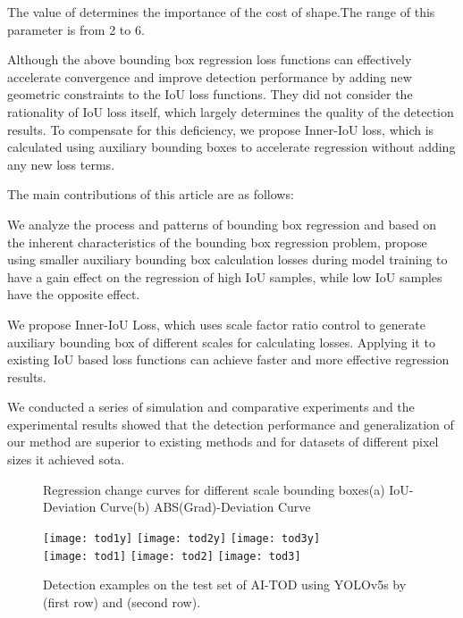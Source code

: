\documentclass[lettersize,journal]{IEEEtran}
\begin{document}
	
	\par The value of  determines the importance of the cost of shape.The range of this parameter is from 2 to 6.
	\par Although the above bounding box regression loss functions can effectively accelerate convergence and improve detection performance by adding new geometric constraints to the IoU loss functions. They did not consider the rationality of IoU loss itself, which largely determines the quality of the detection results. To compensate for this deficiency, we propose Inner-IoU loss, which is calculated using auxiliary bounding boxes to accelerate regression without adding any new loss terms.
	\par The main contributions of this article are as follows:
	\par We analyze the process and patterns of bounding box regression and based on the inherent characteristics of the bounding box regression problem, propose using smaller auxiliary bounding box calculation losses during model training to have a gain effect on the regression of high IoU samples, while low IoU samples have the opposite effect.
	\par We propose Inner-IoU Loss, which uses scale factor ratio control to generate auxiliary bounding box of different scales for calculating losses. Applying it to existing IoU based loss functions can achieve faster and more effective regression results.
	\par We conducted a series of simulation and comparative experiments and the experimental results showed that the detection performance and generalization of our method are superior to existing methods and for datasets of different pixel sizes it achieved sota.
		\begin{figure}[!htbp]
		\centering
		\hfill 
		\caption{Regression change curves for different scale bounding boxes(a) IoU-Deviation Curve(b) ABS(Grad)-Deviation Curve}
		\label{fig_3}
	\end{figure}
\begin{figure*} [t!]
		\centering
		\texttt{[image: tod1y]}
		\hspace{.15in}
		\vspace{.15in}
		\texttt{[image: tod2y]}
		\hspace{.15in}
		\texttt{[image: tod3y]} 
		\\
		\texttt{[image: tod1]}
		\hspace{.15in}
		\texttt{[image: tod2]} 
		\hspace{.13in}
		\texttt{[image: tod3]}
		\caption{Detection examples on the test set of AI-TOD using YOLOv5s by  (first row) and (second row). }
		\label{fig_8} 
	\end{figure*}
\end{document}
